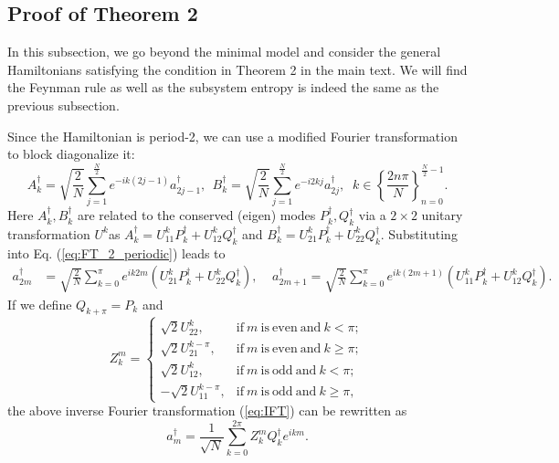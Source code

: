 \subsection{Proof of %
Theorem 2 \label{subsec:Proof-of-main}}

In this subsection, we go %
beyond the minimal model and consider the general Hamiltonians satisfying the condition in %
Theorem 2 in the main text. We will find the Feynman rule as well as the subsystem entropy
is indeed the same as the previous subsection.

Since the Hamiltonian is period-2, we can use a modified Fourier
transformation to block diagonalize it:
\begin{equation}
A_{k}^{\dagger}=\sqrt{\frac{2}{N}}\sum_{j=1}^{\frac{N}{2}}e^{-ik(2j-1)}a_{2j-1}^{\dagger},\ \ B_k^\dag=\sqrt{\frac{2}{N}}\sum_{j=1}^{\frac{N}{2}}e^{-i2kj}a_{2j}^{\dagger},\;\;%
k\in\left\{\frac{2n\pi}{N}\right\}^{\frac{N}{2}-1}_{n=0}.
\label{eq:FT_2_periodic}
\end{equation}
Here $A_{k}^{\dagger},B_{k}^{\dagger}$ are related to the conserved (eigen) modes
$P_{k}^{\dagger},Q_{k}^{\dagger}$ via a $2\times2$ unitary transformation
$U^{k}$as $A_{k}^{\dagger}=U_{11}^{k}P_{k}^{\dagger}+U_{12}^{k}Q_{k}^{\dagger}$
and $B_{k}^{\dagger}=U_{21}^{k}P_{k}^{\dagger}+U_{22}^{k}Q_{k}^{\dagger}$.
Substituting into Eq. (\ref{eq:FT_2_periodic}) leads to 
\begin{align}
a_{2m}^{\dagger} & =\sqrt{\frac{2}{N}}\sum_{k=0}^{\pi}e^{ik2m}(U_{21}^{k}P_{k}^{\dagger}+U_{22}^{k}Q_{k}^{\dagger}),\;\;\;\;
a_{2m+1}^{\dagger}  =\sqrt{\frac{2}{N}}\sum_{k=0}^{\pi}e^{ik(2m+1)}(U_{11}^{k}P_{k}^{\dagger}+U_{12}^{k}Q_{k}^{\dagger}).
\label{eq:IFT}
\end{align}
If we define $Q_{k+\pi}=P_{k}$ %
and 
\begin{equation}
Z_{k}^{m}=\begin{cases}
\sqrt{2}U_{22}^{k}, & \mathrm{if\ }m\ \mathrm{is\ even\ and}\ k<\pi;\\
\sqrt{2}U_{21}^{k-\pi}, & \mathrm{if\ }m\ \mathrm{is\ even\ and}\ k\geq\pi;\\
\sqrt{2}U_{12}^{k}, & \mathrm{if\ }m\ \mathrm{is\ odd\ and}\ k<\pi;\\
-\sqrt{2}U_{11}^{k-\pi}, & \mathrm{if\ }m\ \mathrm{is\ odd\ and}\ k\geq\pi,
\end{cases}
\label{eq:Zkm}
\end{equation}
the above inverse Fourier transformation (\ref{eq:IFT}) can be rewritten as
\[
a_{m}^{\dagger}=\frac{1}{\sqrt{N}}\sum_{k=0}^{2\pi}Z_{k}^{m}Q_{k}^{\dagger}e^{ikm}.
\]
